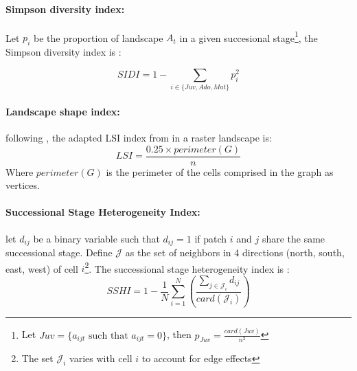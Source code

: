 

\paragraph{Simpson diversity index:}
Let $p_i$ be the proportion of landscape $A_t$ in a given succesional stage\footnote{Let $Juv = \{a_{ijt} \text{ such that } a_{ijt}=0\}$, then $p_{Juv} = \frac{card(Juv)}{n^2}$}, the Simpson diversity index is : 

\begin{equation}
SIDI = 1 - \sum_{i \in \{Juv, Ado, Mat\}} p_i^2
    \label{eq:simpson}
\end{equation}


\paragraph{Landscape shape index:}
following \cite{McGarigal_1995}, the adapted LSI index from \cite{patton_diversity_1975} in a raster landscape is:
\begin{equation}
    LSI = \frac{0.25\times perimeter(G)}{n}
    \label{eq:LSI}
\end{equation}
Where $perimeter(G)$ is the perimeter of the cells comprised in the graph as vertices.

\paragraph{Successional Stage Heterogeneity Index:} let $d_{ij}$ be a binary variable such that $d_{ij}=1$ if patch $i$ and $j$ share the same successional stage. Define $\mathcal{J}$ as the set of neighbors in 4 directions (north, south, east, west) of cell $i$\footnote{The set $\mathcal{J}_i$ varies with cell $i$ to account for edge effects}.
The successional stage heterogeneity index is : 
\begin{equation}
    SSHI = 1 - \frac{1}{N}\sum_{i=1}^N\left( \frac{\sum_{j \in \mathcal{J}_i} d_{ij}}{card(\mathcal{J}_i)}\right)
\end{equation}
\label{eq:lth_index}


